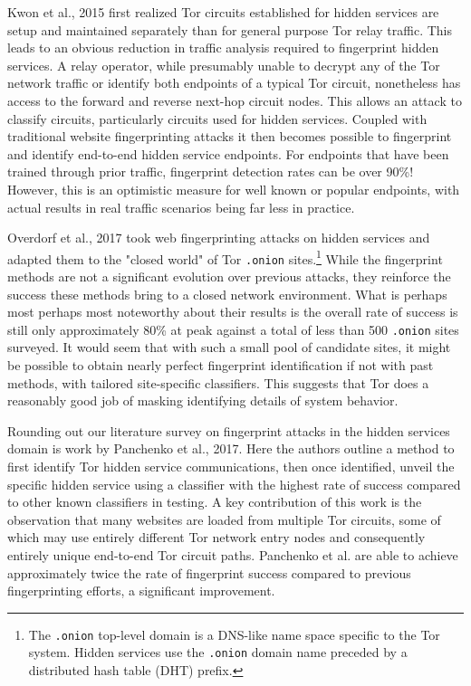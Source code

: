 \documentclass[sigconf]{acmart}
\begin{document}
Kwon et al., 2015 \cite{kwon_circuit_2015} first realized Tor circuits
established for hidden services are setup and maintained separately than
for general purpose Tor relay traffic.  This leads to an obvious
reduction in traffic analysis required to fingerprint hidden services.
A relay operator, while presumably unable to decrypt any of the Tor
network traffic or identify both endpoints of a typical Tor circuit,
nonetheless has access to the forward and reverse next-hop circuit
nodes.  This allows an attack to classify circuits, particularly
circuits used for hidden services.  Coupled with traditional website
fingerprinting attacks it then becomes possible to fingerprint and
identify end-to-end hidden service endpoints.  For endpoints that have
been trained through prior traffic, fingerprint detection rates can be
over 90\%!  However, this is an optimistic measure for well known or
popular endpoints, with actual results in real traffic scenarios being
far less in practice.

Overdorf et al., 2017 \cite{overdorf_how_2017} took web fingerprinting
attacks on hidden services and adapted them to the "closed world" of Tor
\texttt{.onion} sites.\footnote{The \texttt{.onion} top-level domain is
a DNS-like name space specific to the Tor system.  Hidden services use
the \texttt{.onion} domain name preceded by a distributed hash table
(DHT) prefix.}  While the fingerprint methods are not a significant
evolution over previous attacks, they reinforce the success these
methods bring to a closed network environment.  What is perhaps most
perhaps most noteworthy about their results is the overall rate of
success is still only approximately 80\% at peak against a total of less
than 500 \texttt{.onion} sites surveyed.  It would seem that with such a
small pool of candidate sites, it might be possible to obtain nearly
perfect fingerprint identification if not with past methods, with
tailored site-specific classifiers.  This suggests that Tor does a
reasonably good job of masking identifying details of system behavior.

Rounding out our literature survey on fingerprint attacks in the hidden
services domain is work by Panchenko et al.,
2017\cite{panchenko_analysis_2017}.  Here the authors outline a method
to first identify Tor hidden service communications, then once
identified, unveil the specific hidden service using a classifier with
the highest rate of success compared to other known classifiers in
testing.  A key contribution of this work is the observation that many
websites are loaded from multiple Tor circuits, some of which may use
entirely different Tor network entry nodes and consequently entirely
unique end-to-end Tor circuit paths.  Panchenko et al. are able to
achieve approximately twice the rate of fingerprint success compared to
previous fingerprinting efforts, a significant improvement.
\end{document}
